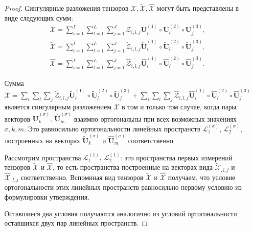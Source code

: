 \documentclass[specialist,
    substylefile = spbu_report.rtx,
    subf,href,colorlinks=true, 12pt]{disser}
\theoremstyle{plain}
\theoremstyle{definition}
\theoremstyle{remark}
\begin{document}
    \begin{proof}
        Сингулярные разложения тензоров $\mathcal{X}, \tilde{\mathcal{X}}, \hat{\mathcal{X}}$ могут быть представлены в виде
        следующих сумм:
        \[
            \begin{aligned}
                \mathcal{X}=\sum_{i=1}^{I} \sum_{l=1}^{L} \sum_{j=1}^{J} \mathcal{Z}_{i,l,j} \mathbf{U}^{(1)}_{i}
                \circ \mathbf{U}^{(2)}_{l} \circ \mathbf{U}^{(3)}_{j},\\
                \tilde{\mathcal{X}}=\sum_{i=1}^{I} \sum_{l=1}^{L} \sum_{j=1}^{J} \tilde{\mathcal{Z}}_{i,l,j}
                \tilde{\mathbf{U}}^{(1)}_{i} \circ \tilde{\mathbf{U}}^{(2)}_{l} \circ \tilde{\mathbf{U}}^{(3)}_{j},\\
                \hat{\mathcal{X}}=\sum_{i=1}^{I} \sum_{l=1}^{L} \sum_{j=1}^{J} \hat{\mathcal{Z}}_{i,l,j}
                \hat{\mathbf{U}}^{(1)}_{i} \circ \hat{\mathbf{U}}^{(2)}_{l} \circ \hat{\mathbf{U}}^{(3)}_{j}.
            \end{aligned}
        \]

        Сумма $\mathcal{X} = \sum_{i} \sum_{l} \sum_{j} \tilde{\mathcal{Z}}_{i,l,j}
        \tilde{\mathbf{U}}^{(1)}_{i} \circ \tilde{\mathbf{U}}^{(2)}_{l} \circ \tilde{\mathbf{U}}^{(3)}_{j} +
        \sum_{i} \sum_{l} \sum_{j} \hat{\mathcal{Z}}_{i,l,j} \hat{\mathbf{U}}^{(1)}_{i} \circ \hat{\mathbf{U}}^{(2)}_{l}
        \circ \hat{\mathbf{U}}^{(3)}_{j}$ является сингулярным разложением $\mathcal{X}$ в том и только том случае, когда
        пары векторов $\tilde{\mathbf{U}}^{(\sigma)}_{k},\, \hat{\mathbf{U}}^{(\sigma)}_{m}$ взаимно ортогональны
        при всех возможных значениях $\sigma, k, m$.
        Это равносильно ортогональности линейных пространств $\mathcal{L}^{(\sigma)}_{1},\, \mathcal{L}^{(\sigma)}_{2}$,
        построенных на векторах $\tilde{\mathbf{U}}^{(\sigma)}_{k}$ и $\hat{\mathbf{U}}^{(\sigma)}_{m}$ соответственно.

        Рассмотрим пространства $\mathcal{L}^{(1)}_{1},\, \mathcal{L}^{(1)}_{2}$: это пространства первых измерений
        тензоров $\tilde{\mathcal{X}}$ и $\hat{\mathcal{X}}$, то есть пространства построенные на векторах вида
        $\tilde{\mathcal{X}}_{,l,j}$ и $\hat{\mathcal{X}}_{,l,j}$ соответственно.
        Вспоминая вид тензоров $\tilde{\mathcal{X}}$ и $\hat{\mathcal{X}}$ получаем, что условие ортогональности этих
        линейных пространств равносильно первому условию из формулировки утверждения.

        Оставшиеся два условия получаются аналогично из условий ортогональности оставшихся двух пар линейных пространств.
    \end{proof}
\end{document}
